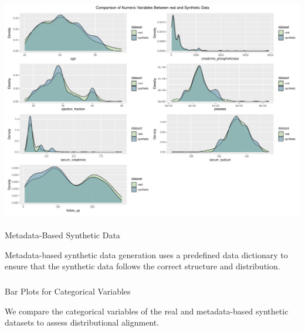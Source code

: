 \documentclass[
  letterpaper,
  DIV=11,
  numbers=noendperiod]{scrartcl}
\makeatletter
\let\oldparagraph\paragraph
\renewcommand{\paragraph}{
    \@ifstar
      \xxxParagraphStar
      \xxxParagraphNoStar
  }
\newcommand{\xxxParagraphStar}[1]{\oldparagraph*{#1}\mbox{}}
\newcommand{\xxxParagraphNoStar}[1]{\oldparagraph{#1}\mbox{}}
\let\oldsubparagraph\subparagraph
\renewcommand{\subparagraph}{
    \@ifstar
      \xxxSubParagraphStar
      \xxxSubParagraphNoStar
  }
\newcommand{\xxxSubParagraphStar}[1]{\oldsubparagraph*{#1}\mbox{}}
\newcommand{\xxxSubParagraphNoStar}[1]{\oldsubparagraph{#1}\mbox{}}
\makeatother
\begin{document}
\begin{center}
\includegraphics[width=1\linewidth,height=\textheight,keepaspectratio]{heart_failure_synthetic_data_project_files/figure-pdf/Density plots for numeric variables (Synthpop-based synthetic data)-1.pdf}
\end{center}

\paragraph{Metadata-Based Synthetic
Data}\label{metadata-based-synthetic-data-1}

Metadata-based synthetic data generation uses a predefined data
dictionary to ensure that the synthetic data follows the correct
structure and distribution.

\subparagraph{Bar Plots for Categorical
Variables}\label{bar-plots-for-categorical-variables-3}

We compare the categorical variables of the real and metadata-based
synthetic datasets to assess distributional alignment.
\end{document}
